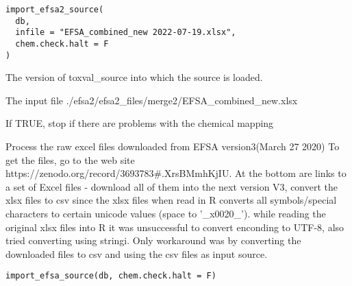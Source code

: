 \documentclass[letterpaper]{book}
\begin{document}
%
\begin{Usage}
\begin{verbatim}
import_efsa2_source(
  db,
  infile = "EFSA_combined_new 2022-07-19.xlsx",
  chem.check.halt = F
)
\end{verbatim}
\end{Usage}
%
\begin{Arguments}
\begin{ldescription}
\item[\code{db}] The version of toxval\_source into which the source is loaded.

\item[\code{infile}] The input file ./efsa2/efsa2\_files/merge2/EFSA\_combined\_new.xlsx

\item[\code{chem.check.halt}] If TRUE, stop if there are problems with the chemical mapping
\end{ldescription}
\end{Arguments}
%
\begin{Description}\relax
Process the raw excel files downloaded from EFSA version3(March 27 2020)
To get the files, go to the web site
https://zenodo.org/record/3693783\#.XrsBMmhKjIU. At the bottom are links to
a set of Excel files - download all of them into the next version V3,
convert the xlsx files to csv since the xlsx files when read in R converts all symbols/special characters
to certain unicode values (space to '\_x0020\_'). while reading the original xlsx files into R
it was unsuccessful to convert enconding to UTF-8, also tried converting using stringi. Only workaround was
by converting the downloaded files to csv and using the csv files as input source.
\end{Description}
%
\begin{Usage}
\begin{verbatim}
import_efsa_source(db, chem.check.halt = F)
\end{verbatim}
\end{Usage}
\end{document}
